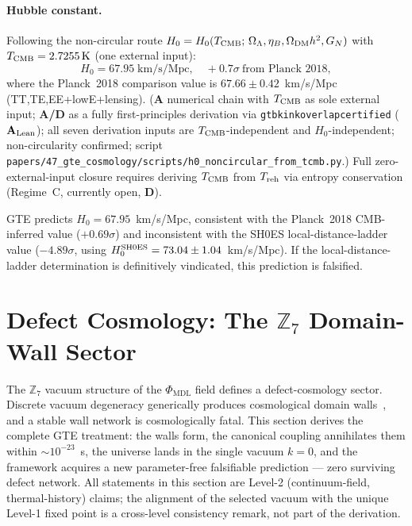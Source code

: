 \documentclass[11pt]{article}
\theoremstyle{remark}
\newcommand{\PHIMDL}{\Phi_{\mathrm{MDL}}}
\newcommand{\ZS}{\mathbb{Z}_7}
\newcommand{\lean}[1]{%
  \penalty-100
  \begingroup\def\_{\textunderscore\allowbreak}\texttt{#1}\endgroup}
\newcommand{\CatA}{\textbf{A}}
\newcommand{\CatAL}{\ensuremath{\textbf{A}_{\rm Lean}}}
\newcommand{\CatAD}{\textbf{A/D}}
\newcommand{\CatD}{\textbf{D}}
\begin{document}
\paragraph{Hubble constant.}
Following the non-circular route $H_0 = H_0(T_{\rm CMB};\,\Omega_\Lambda, \eta_B, \Omega_{\rm DM}h^2, G_N)$
with $T_{\rm CMB} = 2.7255\,\text{K}$ (one external input):
\begin{equation}
  H_0 = 67.95\;\text{km/s/Mpc}, \quad +0.7\sigma\ \text{from Planck~2018},
\end{equation}
where the Planck~2018 comparison value is
$67.66\pm0.42$~km/s/Mpc (TT,TE,EE+lowE+lensing).
(\CatA{} numerical chain with $T_{\rm CMB}$ as sole external input; \CatAD{} as a
fully first-principles derivation via \lean{gtb\_kink\_overlap\_certified}
(\CatAL{}); all seven derivation inputs are $T_{\rm CMB}$-independent and
$H_0$-independent; non-circularity confirmed; script
\texttt{papers/47\_gte\_cosmology/\allowbreak scripts/h0\_noncircular\_from\_tcmb.py}.)
Full zero-external-input closure requires deriving $T_{\rm CMB}$ from $T_{\rm reh}$
via entropy conservation (Regime~C, currently open, \CatD{}).

GTE predicts $H_0 = 67.95$~km/s/Mpc, consistent with the Planck~2018
CMB-inferred value ($+0.69\sigma$) and inconsistent with the SH0ES
local-distance-ladder value ($-4.89\sigma$, using
$H_0^{\rm SH0ES} = 73.04\pm1.04$~km/s/Mpc). If the local-distance-ladder
determination is definitively vindicated, this prediction is falsified.

\section{Defect Cosmology: The $\ZS$ Domain-Wall Sector}
\label{sec:defect}

The $\ZS$ vacuum structure of the $\PHIMDL$ field defines a defect-cosmology
sector. Discrete vacuum degeneracy generically produces cosmological domain
walls~\cite{ZeldovichKobzarevOkun1974,Kibble1976,VilenkinShellard1994}, and a
stable wall network is cosmologically fatal. This section derives the complete
GTE treatment: the walls form, the canonical coupling annihilates them within
$\sim\!10^{-23}$~s, the universe lands in the single vacuum $k = 0$, and the
framework acquires a new parameter-free falsifiable prediction --- zero
surviving defect network. All statements in this section are Level-2
(continuum-field, thermal-history) claims; the alignment of the selected vacuum
with the unique Level-1 fixed point is a cross-level consistency remark, not
part of the derivation.
\end{document}
